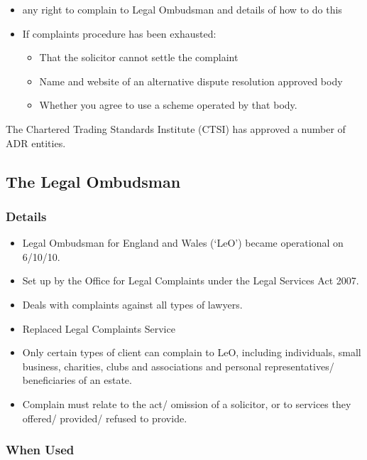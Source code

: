 \documentclass[
]{article}
\providecommand{\tightlist}{%
  \setlength{\itemsep}{0pt}\setlength{\parskip}{0pt}}
\begin{document}
\begin{itemize}
\tightlist
\item
  any right to complain to Legal Ombudsman and details of how to do this
\item
  If complaints procedure has been exhausted:

  \begin{itemize}
  \tightlist
  \item
    That the solicitor cannot settle the complaint
  \item
    Name and website of an alternative dispute resolution approved body
  \item
    Whether you agree to use a scheme operated by that body.
  \end{itemize}
\end{itemize}

The Chartered Trading Standards Institute (CTSI) has approved a number
of ADR entities.

\hypertarget{the-legal-ombudsman}{%
\subsection{The Legal Ombudsman}\label{the-legal-ombudsman}}

\hypertarget{details}{%
\subsubsection{Details}\label{details}}

\begin{itemize}
\tightlist
\item
  Legal Ombudsman for England and Wales (`LeO') became operational on
  6/10/10.
\item
  Set up by the Office for Legal Complaints under the Legal Services Act
  2007.
\item
  Deals with complaints against all types of lawyers.
\item
  Replaced Legal Complaints Service
\item
  Only certain types of client can complain to LeO, including
  individuals, small business, charities, clubs and associations and
  personal representatives/ beneficiaries of an estate.
\item
  Complain must relate to the act/ omission of a solicitor, or to
  services they offered/ provided/ refused to provide.
\end{itemize}

\hypertarget{when-used}{%
\subsubsection{When Used}\label{when-used}}
\end{document}
